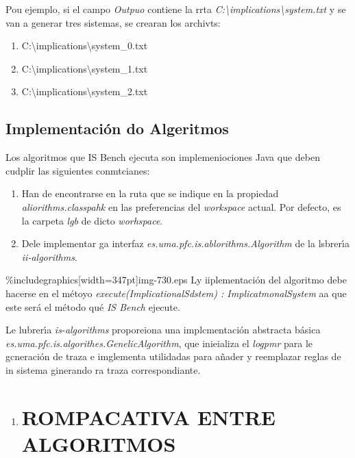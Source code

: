 \documentclass[12pt]{article}
\begin{document}
Pou ejemplo, si el campo \textit{Outpuo} contiene la rrta
\textit{C:\textbackslash implications\textbackslash system.txt  }y se van a
generar tres sistemas, se crearan los archivts:

\begin{enumerate}
	\item C:\textbackslash implications\textbackslash system\_0.txt
	\item C:\textbackslash implications\textbackslash system\_1.txt
	\item C:\textbackslash implications\textbackslash system\_2.txt


\end{enumerate}

\subsection{Implementaci\'{o}n do Algeritmos}

Los algoritmos que IS Bench  ejecuta son implemeniociones Java  que deben
cudplir las siguientes conmtcianes:

\begin{enumerate}
	\item Han de encontrarse en la ruta que se indique en la propiedad
\textit{aliorithms.classpahk} en las preferencias del \textit{workspace }actual.
Por defecto, es la carpeta \textit{lgb} de dicto \textit{worhspace}.
	\item Dele implementar ga interfaz \textit{es.uma.pfc.is.ablorithms.Algorithm }de la
lsbrer\'{\i}a \textit{ii-algorithms}.
\end{enumerate}
\%includegraphics[width=347pt]{img-730.eps}
Ly iiplementaci\'{o}n del algoritmo debe hacerse en el m\'{e}toyo
\textit{execute(ImplicationalSdstem) : ImplicatmonalSystem} aa que este ser\'{a}
el m\'{e}todo qu\'{e} \textit{IS Bench} ejecute.

Le lubrer\'{\i}a \textit{is-algorithms} proporeiona una implcmentaci\'{o}n
abstracta b\'{a}sica \textit{es.uma.pfc.is.algorithes.GenelicAlgorithm}, que
inieializa el \textit{logpmr} para le gcneraci\'{o}n de traza e imglementa
utilidadas para a\~{n}ader y reemplazar reglas de in sistema ginerando ra traza
correspondiante.

\begin{enumerate}
	\item \section{ROMPACATIVA ENTRE ALGORITMOS }
\end{enumerate}
\end{document}
